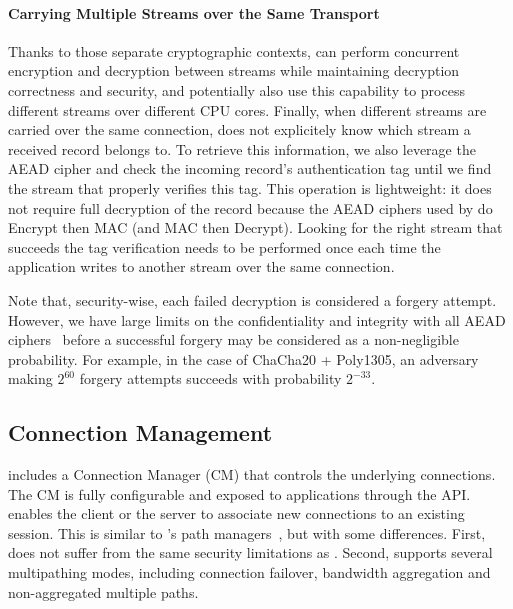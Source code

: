 \paragraph*{Carrying Multiple Streams over the Same Transport}
Thanks to those separate cryptographic contexts, \tcpls can perform concurrent
encryption and decryption between streams while maintaining decryption
correctness and security, and potentially also use this capability to process
different streams over different CPU cores.
Finally, when different streams are carried
over the same \tcp connection, \tcpls does not explicitely know which stream
a received record belongs to. To retrieve this information,
we also
leverage the AEAD cipher and check the incoming record's authentication tag
until we find the stream that properly verifies this tag. This operation is
lightweight: it does not require full decryption of the record because the AEAD
ciphers used by  do Encrypt then MAC (and MAC then Decrypt).
Looking for the right stream that succeeds the tag verification needs to be
performed once each time the application writes to another stream over the same
\tcp connection.

Note that, security-wise, each failed decryption is considered a
forgery attempt. However, we have large limits on the confidentiality and
integrity with all AEAD ciphers~\cite{luykx2015limits, aeadlimits} before a
successful forgery may be considered as a non-negligible probability. For
example, in the case of ChaCha20 + Poly1305, an adversary making $2^{60}$ forgery
attempts succeeds with probability $2^{-33}$.

\subsection{Connection Management}\label{sec:multipath}

\tcpls includes a Connection Manager (CM) that controls the underlying \tcp
connections.
The CM is fully configurable and exposed to applications through the \tcpls API.
\tcpls enables the client or the server to associate new \tcp connections to an
existing \tcpls session. This is similar to \mptcp's path
managers~\cite{raiciu2012hard,hesmans2015smapp,hesmans2016enhanced},
but with some differences. First, \tcpls does not suffer from the same
security limitations as \mptcp. Second, \tcpls supports several multipathing
modes, including connection failover, bandwidth aggregation and non-aggregated
multiple paths.

